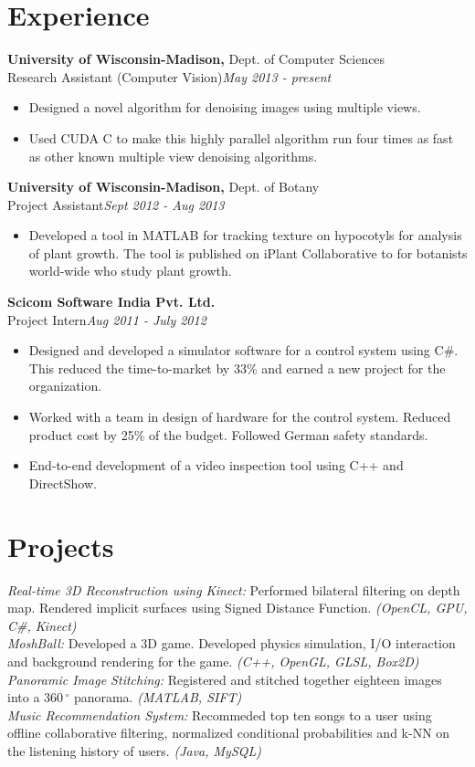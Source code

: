 \documentclass[margin]{res}
\begin{document}
\begin{resume}
\section{Experience}
 {\bf University of Wisconsin-Madison,} Dept. of Computer Sciences \\
Research Assistant (Computer Vision)\hfill {\it May 2013 - present}
 \begin{itemize} \itemsep -2pt  %
 \item Designed a novel algorithm for denoising images using multiple views.
 \item Used CUDA C to make this highly parallel algorithm run four times as fast as other known multiple view denoising algorithms. 
 \end{itemize}

  {\bf University of Wisconsin-Madison,} Dept. of Botany \\
Project Assistant\hfill {\it Sept 2012 - Aug 2013}
 \begin{itemize} \itemsep -2pt  %
 \item Developed a tool in MATLAB for tracking texture on hypocotyls for analysis of plant growth. The tool is published on iPlant Collaborative to for botanists world-wide who study plant growth.
 \end{itemize}
  {\bf Scicom Software India Pvt. Ltd.} \\
Project Intern\hfill{\it Aug 2011 - July 2012}
 \begin{itemize} \itemsep -2pt  %
 \item Designed and developed a simulator software for a control system using C\#. This reduced the time-to-market by 33\% and earned a new project for the organization.
 \item Worked with a team in design of hardware for the control system. Reduced product cost by 25\% of the budget. Followed German safety standards. 
 \item End-to-end development of a video inspection tool using C++ and DirectShow.
 \end{itemize}
\section{Projects}
{\it Real-time 3D Reconstruction using Kinect:} Performed bilateral filtering on depth map. Rendered implicit surfaces using Signed Distance Function. {\it(OpenCL, GPU, C\#, Kinect)}
\\{\it MoshBall:} Developed a 3D game. Developed physics simulation, I/O interaction and background rendering for the game. {\it (C++, OpenGL, GLSL, Box2D)}  
\\{\it Panoramic Image Stitching:} Registered and stitched together eighteen images into a $360\,^{\circ}$ panorama. {\it (MATLAB, SIFT)}
\\{\it Music Recommendation System:} Recommeded top ten songs to a user using offline collaborative filtering, normalized conditional probabilities and k-NN on the listening history of users. {\it (Java, MySQL)}


\end{resume}
\end{document}
